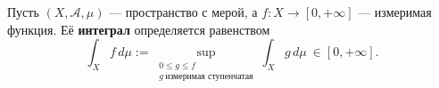 \label{definition:24}

\begin{definition}
Пусть $(X,\mathcal A,\mu)$ --- пространство с мерой, а $f:X\to[0,+\infty]$ --- измеримая функция.
Её \textbf{интеграл} определяется равенством
\[
  \int_X f\,d\mu:=
  \sup_{\substack{0\le g\le f\\g\ \text{измеримая ступенчатая}}}
  \int_X g\,d\mu\ \in[0,+\infty].
\]
\end{definition}
